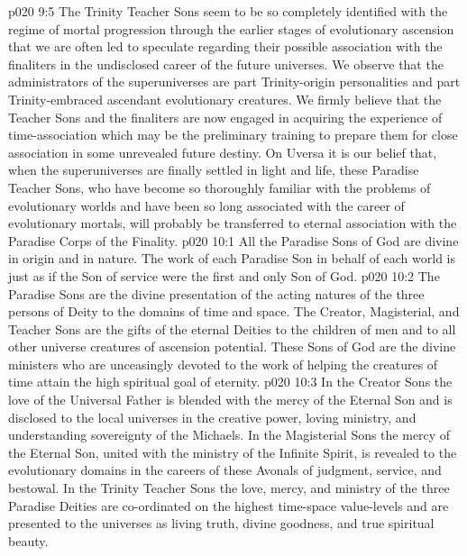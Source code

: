 \vs p020 9:5 \pc The Trinity Teacher Sons seem to be so completely identified with the regime of mortal progression through the earlier stages of evolutionary ascension that we are often led to speculate regarding their possible association with the finaliters in the undisclosed career of the future universes. We observe that the administrators of the superuniverses are part Trinity\hyp{}origin personalities and part Trinity\hyp{}embraced ascendant evolutionary creatures. We firmly believe that the Teacher Sons and the finaliters are now engaged in acquiring the experience of time\hyp{}association which may be the preliminary training to prepare them for close association in some unrevealed future destiny. On Uversa it is our belief that, when the superuniverses are finally settled in light and life, these Paradise Teacher Sons, who have become so thoroughly familiar with the problems of evolutionary worlds and have been so long associated with the career of evolutionary mortals, will probably be transferred to eternal association with the Paradise Corps of the Finality.
\vs p020 10:1 All the Paradise Sons of God are divine in origin and in nature. The work of each Paradise Son in behalf of each world is just as if the Son of service were the first and only Son of God.
\vs p020 10:2 The Paradise Sons are the divine presentation of the acting natures of the three persons of Deity to the domains of time and space. The Creator, Magisterial, and Teacher Sons are the gifts of the eternal Deities to the children of men and to all other universe creatures of ascension potential. These Sons of God are the divine ministers who are unceasingly devoted to the work of helping the creatures of time attain the high spiritual goal of eternity.
\vs p020 10:3 In the Creator Sons the love of the Universal Father is blended with the mercy of the Eternal Son and is disclosed to the local universes in the creative power, loving ministry, and understanding sovereignty of the Michaels. In the Magisterial Sons the mercy of the Eternal Son, united with the ministry of the Infinite Spirit, is revealed to the evolutionary domains in the careers of these Avonals of judgment, service, and bestowal. In the Trinity Teacher Sons the love, mercy, and ministry of the three Paradise Deities are co\hyp{}ordinated on the highest time\hyp{}space value\hyp{}levels and are presented to the universes as living truth, divine goodness, and true spiritual beauty.

